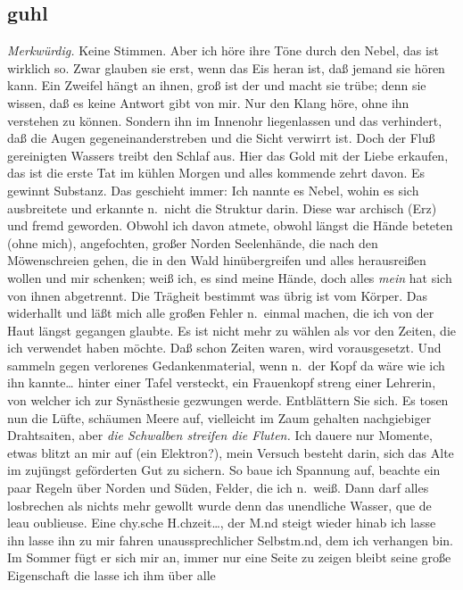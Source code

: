 \documentclass[
]{article}
\author{}
\date{\vspace{-2.5em}}
\begin{document}
\subsection{guhl}\label{guhl}

\emph{Merkwürdig. }Keine Stimmen. Aber ich höre ihre Töne durch den
Nebel, das ist wirklich so. Zwar glauben sie erst, wenn das Eis heran
ist, daß jemand sie hören kann. Ein Zweifel hängt an ihnen, groß ist der
und macht sie trübe; denn sie wissen, daß es keine Antwort gibt von mir.
Nur den Klang höre, ohne ihn verstehen zu können. Sondern ihn im
Innenohr liegenlassen und das verhindert, daß die Augen
gegeneinanderstreben und die Sicht verwirrt ist. Doch der Fluß
gereinigten Wassers treibt den Schlaf aus. Hier das Gold mit der Liebe
erkaufen, das ist die erste Tat im kühlen Morgen und alles kommende
zehrt davon. Es gewinnt Substanz. Das geschieht immer: Ich nannte es
Nebel, wohin es sich ausbreitete und erkannte n.~nicht die Struktur
darin. Diese war archisch (Erz) und fremd geworden. Obwohl ich davon
atmete, obwohl längst die Hände beteten (ohne mich), angefochten, großer
Norden Seelenhände, die nach den Möwenschreien gehen, die in den Wald
hinübergreifen und alles herausreißen wollen und mir schenken; weiß ich,
es sind meine Hände, doch alles \emph{mein} hat sich von ihnen
abgetrennt. Die Trägheit bestimmt was übrig ist vom Körper. Das
widerhallt und läßt mich alle großen Fehler n.~einmal machen, die ich
von der Haut längst gegangen glaubte. Es ist nicht mehr zu wählen als
vor den Zeiten, die ich verwendet haben möchte. Daß schon Zeiten waren,
wird vorausgesetzt. Und sammeln gegen verlorenes Gedankenmaterial, wenn
n.~der Kopf da wäre wie ich ihn kannte\ldots{} hinter einer Tafel
versteckt, ein Frauenkopf streng einer Lehrerin, von welcher ich zur
Synästhesie gezwungen werde. Entblättern Sie sich. Es tosen nun die
Lüfte, schäumen Meere auf, vielleicht im Zaum gehalten nachgiebiger
Drahtsaiten, aber \emph{die Schwalben streifen die Fluten.} Ich dauere
nur Momente, etwas blitzt an mir auf (ein Elektron?), mein Versuch
besteht darin, sich das Alte im zujüngst geförderten Gut zu sichern. So
baue ich Spannung auf, beachte ein paar Regeln über Norden und Süden,
Felder, die ich n.~weiß. Dann darf alles losbrechen als nichts mehr
gewollt wurde denn das unendliche Wasser, que de l\textquotesingle eau
oublieuse. Eine chy.sche H.chzeit\ldots, der M.nd steigt wieder hinab
ich lasse ihn lasse ihn zu mir fahren unaussprechlicher Selbstm.nd, dem
ich verhangen bin. Im Sommer fügt er sich mir an, immer nur eine Seite
zu zeigen bleibt seine große Eigenschaft die lasse ich ihm über alle
\end{document}
